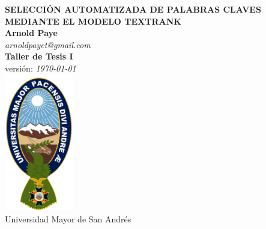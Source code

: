 \begin{titlepage}
	\vspace{3.0cm}
	\begin{center}
		{\huge\bfseries SELECCI\'ON AUTOMATIZADA DE PALABRAS CLAVES
		MEDIANTE EL MODELO TEXTRANK} \\
		\vspace{1.5cm}
		{\Large\bfseries Arnold Paye} \\ [5pt]
		\emph {arnoldpayet@gmail.com} \\[5pt]
		{\small\bfseries Taller de Tesis I} \\
		{\small versi\'on: \emph \today\ } \\
		\vspace{1.5cm}
		\includegraphics[width=3cm,height=6cm]{recursos/img/logo_umsa} \\
		{Universidad Mayor de San Andr\'es} 
	\end{center}
\end{titlepage}
